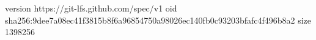 version https://git-lfs.github.com/spec/v1
oid sha256:9dee7a08ec41f3815b8f6a96854750a98026ec140fb0c93203bfafc4f496b8a2
size 1398256
